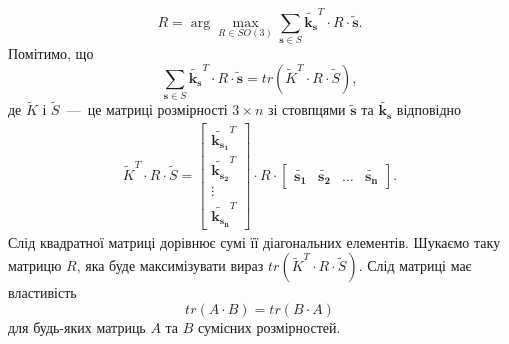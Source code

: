 \begin{equation*}
   R =
   \arg \max \limits_{R \in SO \left( 3 \right) }
    \sum \limits_{\boldsymbol{s} \in S}
      \tilde{\boldsymbol{k_s}}^T \cdot R \cdot \tilde{\boldsymbol{s}}.
\end{equation*}
Помітимо, що
\begin{equation*}
  \sum \limits_{\boldsymbol{s} \in S}
    \tilde{\boldsymbol{k_s}}^T \cdot R \cdot \tilde{\boldsymbol{s}} =
  tr \left( \tilde{K}^T \cdot R \cdot \tilde{S} \right),
\end{equation*}
де $ \tilde{K}$ і $ \tilde{S}$~---~це матриці розмірності $3 \times n$
зі стовпцями $ \tilde{\boldsymbol{s}}$ та $ \tilde{\boldsymbol{k_s}}$ відповідно
\begin{equation*}
  \begin{gathered}
    \tilde{K}^T \cdot R \cdot \tilde{S} =
    \begin{bmatrix}
      \tilde{\boldsymbol{k_{s_1}}}^T \\
      \tilde{\boldsymbol{k_{s_2}}}^T \\
      \vdots \\
      \tilde{\boldsymbol{k_{s_n}}}^T
    \end{bmatrix} \cdot R \cdot
    \begin{bmatrix}
      \tilde{\boldsymbol{s_1}} & \tilde{\boldsymbol{s_2}} & \dotsc & \tilde{\boldsymbol{s_n}}
    \end{bmatrix}.
  \end{gathered}
\end{equation*}
Слід квадратної матриці дорівнює сумі її діагональних елементів.
Шукаємо таку матрицю $R$, яка буде максимізувати вираз
$tr \left( \tilde{K}^T \cdot R \cdot \tilde{S} \right) $.
Слід матриці має властивість \cite{trace:fukugana}
\begin{equation}\label{eq:trace}
  tr \left( A \cdot B \right) =
  tr \left( B \cdot A \right)
\end{equation}
для будь-яких матриць $A$ та $B$ сумісних розмірностей.

